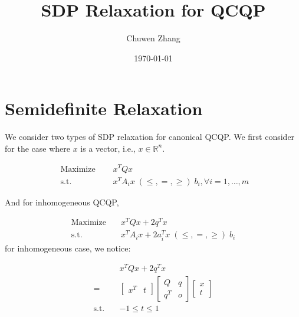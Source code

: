 \documentclass[../main]{subfiles}
\title{SDP Relaxation for QCQP}
\author{Chuwen Zhang}
\date{\today}
\begin{document}
\maketitle
{
  \setcounter{tocdepth}{3}
  \tableofcontents
}
\section{Semidefinite Relaxation}

We consider two types of SDP relaxation for canonical QCQP.
We first consider for the case where $x$ is a vector, i.e., $x \in \mathbb R^n$.

\begin{equation}
  \begin{aligned}
    \textrm { Maximize } \quad & x^{T} Q x                                                      \\
    \text { s.t. }  \quad      & x^{T} A_{i} x\; (\le, =, \ge) \; b_{i}, \forall i=1, \ldots, m
  \end{aligned}
\end{equation}

And for inhomogeneous QCQP,

\begin{equation}
  \begin{aligned}
    \mathrm{Maximize}\quad & x^TQx +2 q^T x                                   \\
    \mathrm{s.t.}  \quad   & x^{T} A_i x  + 2a_i^Tx   \; (\le, =, \ge) \; b_i
  \end{aligned}
\end{equation}
for inhomogeneous case, we notice:

\begin{equation*}
  \begin{aligned}
                        & x^{T} Q x  + 2q^Tx        \\
    =                   & \begin{bmatrix}x^T & t\end{bmatrix}
    \begin{bmatrix} Q   & q \\ q^T & o \end{bmatrix}
    \begin{bmatrix} x \\ t\end{bmatrix}                       \\
    \mathrm{s.t.} \quad & - 1\le t \le 1
  \end{aligned}
\end{equation*}
\end{document}
